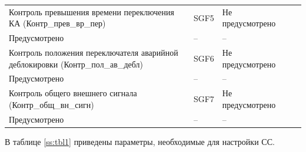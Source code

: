 \begin{longtable}{|>{\centering\arraybackslash}m{5.3cm}|>{\centering\arraybackslash}m{3.3cm}|>{\centering\arraybackslash}m{4.2cm}|>{\centering\arraybackslash}m{1.8cm}|>{\centering\arraybackslash}m{1cm}|}
\hline
\centering Контроль превышения времени переключения КА (Контр\_прев\_вр\_пер)  & \centering SGF5 & \centering Не предусмотрено \\ Предусмотрено & \centering -- & \centering \arraybackslash -- \\
\hline
\centering Контроль положения переключателя аварийной деблокировки (Контр\_пол\_ав\_дебл)  & \centering SGF6 & \centering Не предусмотрено \\ Предусмотрено & \centering -- & \centering \arraybackslash -- \\
\hline
\centering Контроль общего внешнего сигнала (Контр\_общ\_вн\_сигн)  & \centering SGF7 & \centering Не предусмотрено \\ Предусмотрено & \centering -- & \centering \arraybackslash -- \\
\hline
\end{longtable}
\normalsize


\par
В таблице \ref{ss:tbl1} приведены параметры, необходимые для настройки СС. 

